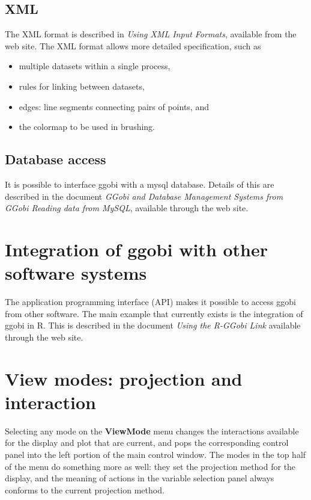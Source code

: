 \documentclass[11pt]{article}
\begin{document}
\subsection {XML}
\label{slbl:XML}

The XML format is described in {\em Using XML Input Formats},
available from the web site.  The XML format allows more detailed
specification, such as

\begin{itemize}
\item multiple datasets within a single process,
\item rules for linking between datasets,
\item edges: line segments connecting pairs of points, and
\item the colormap to be used in brushing.
\end{itemize}

\subsection {Database access}
\label{slbl:MySQL}

It is possible to interface ggobi with a mysql database. Details of
this are described in the document {\em GGobi and Database Management
Systems from GGobi Reading data from MySQL}, available through the web
site.

\section{Integration of ggobi with other software systems}
\label{slbl:Integration}

The application programming interface (API) makes it possible to
access ggobi from other software. The main example that currently
exists is the integration of ggobi in R. This is described in the
document {\em Using the R-GGobi Link} available through the web site.

\section{View modes: projection and interaction}
\label{slbl:ViewModes}

Selecting any mode on the {\bf ViewMode} menu changes the interactions
available for the display and plot that are current, and pops the
corresponding control panel into the left portion of the main control
window.  The modes in the top half of the menu do something more as
well:  they set the projection method for the display, and the meaning
of actions in the variable selection panel always conforms to the current
projection method.
\end{document}
